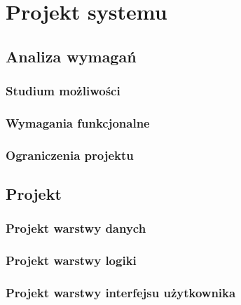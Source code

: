 \chapter{Projekt systemu}

\section{Analiza wymagań}
\subsection{Studium możliwości}
\subsection{Wymagania funkcjonalne}
\subsection{Ograniczenia projektu}

\section{Projekt}
\subsection{Projekt warstwy danych}
\subsection{Projekt warstwy logiki}
\subsection{Projekt warstwy interfejsu użytkownika}